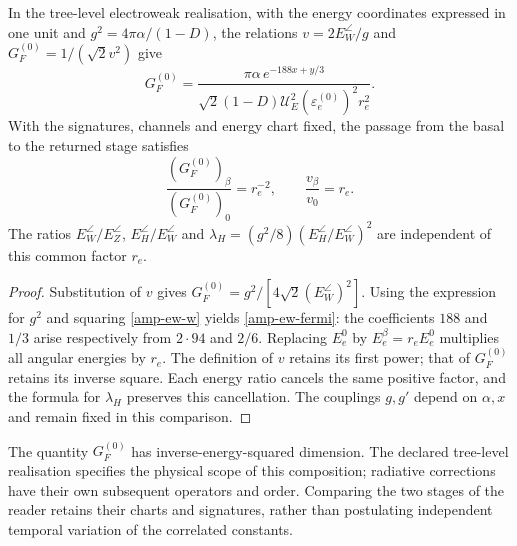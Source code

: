 \begin{proposition}
In the tree-level electroweak realisation, with the energy coordinates
expressed in one unit and $g^2=4\pi\alpha/(1-D)$, the relations
$v=2E_W^\angle/g$ and $G_F^{(0)}=1/(\sqrt2v^2)$ give
\begin{equation}
 G_F^{(0)}=
 \frac{\pi\alpha\,e^{-188x+y/3}}
 {\sqrt2(1-D)\mathcal U_E^2(\varepsilon_e^{(0)})^2r_e^2}.
 \label{amp-ew-fermi}
\end{equation}
With the signatures, channels and energy chart fixed, the passage from
the basal to the returned stage satisfies
\begin{equation}
 \frac{(G_F^{(0)})_\beta}{(G_F^{(0)})_0}=r_e^{-2},\qquad
 \frac{v_\beta}{v_0}=r_e.
 \label{amp-ew-escala}
\end{equation}
The ratios $E_W^\angle/E_Z^\angle$, $E_H^\angle/E_W^\angle$ and
$\lambda_H=(g^2/8)(E_H^\angle/E_W^\angle)^2$ are independent of
this common factor $r_e$.
\end{proposition}
\begin{proof}
Substitution of $v$ gives $G_F^{(0)}=g^2/[4\sqrt2(E_W^\angle)^2]$.
Using the expression for $g^2$ and squaring \eqref{amp-ew-w}
yields \eqref{amp-ew-fermi}: the coefficients $188$ and $1/3$ arise
respectively from $2\cdot94$ and $2/6$. Replacing $E_e^0$ by
$E_e^\beta=r_eE_e^0$ multiplies all angular energies by $r_e$.
The definition of $v$ retains its first power; that of $G_F^{(0)}$
retains its inverse square. Each energy ratio cancels the same positive
factor, and the formula for $\lambda_H$ preserves this cancellation.
The couplings $g,g'$ depend on $\alpha,x$ and remain fixed in this
comparison.
\end{proof}

The quantity $G_F^{(0)}$ has inverse-energy-squared dimension.
The declared tree-level realisation specifies the physical scope of this
composition; radiative corrections have their own subsequent operators
and order. Comparing the two stages of the reader retains their charts
and signatures, rather than postulating independent temporal variation
of the correlated constants.

